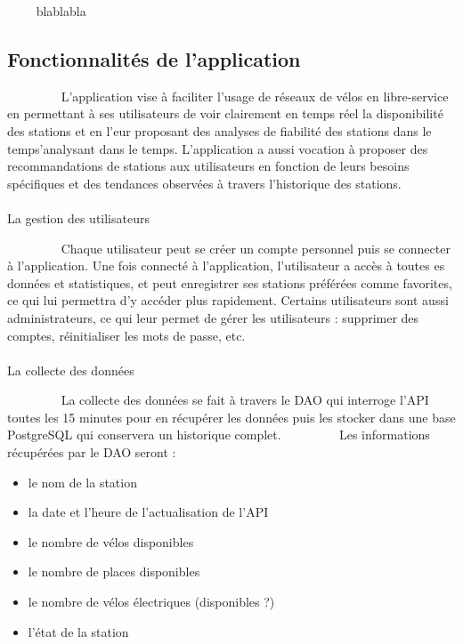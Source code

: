 \documentclass[
  french,
  11pt,
  a4paper,
]{article}
\makeatletter
\let\oldparagraph\paragraph
\renewcommand{\paragraph}{
    \@ifstar
      \xxxParagraphStar
      \xxxParagraphNoStar
  }
\newcommand{\xxxParagraphStar}[1]{\oldparagraph*{#1}\mbox{}}
\newcommand{\xxxParagraphNoStar}[1]{\oldparagraph{#1}\mbox{}}
\providecommand{\tightlist}{%
  \setlength{\itemsep}{0pt}\setlength{\parskip}{0pt}}
\makeatother
\begin{document}
~~~~ blablabla

\subsection{Fonctionnalités de
l'application}\label{fonctionnalituxe9s-de-lapplication}

~~~~~~~~ L'application vise à faciliter l'usage de réseaux de vélos en
libre-service en permettant à ses utilisateurs de voir clairement en
temps réel la disponibilité des stations et en l'eur proposant des
analyses de fiabilité des stations dans le temps'analysant dans le
temps. L'application a aussi vocation à proposer des recommandations de
stations aux utilisateurs en fonction de leurs besoins spécifiques et
des tendances observées à travers l'historique des stations.

\paragraph{La gestion des
utilisateurs}\label{la-gestion-des-utilisateurs}

~~~~~~~~ Chaque utilisateur peut se créer un compte personnel puis se
connecter à l'application. Une fois connecté à l'application,
l'utilisateur a accès à toutes es données et statistiques, et peut
enregistrer ses stations préférées comme favorites, ce qui lui permettra
d'y accéder plus rapidement. Certains utilisateurs sont aussi
administrateurs, ce qui leur permet de gérer les utilisateurs :
supprimer des comptes, réinitialiser les mots de passe, etc.

\paragraph{La collecte des données}\label{la-collecte-des-donnuxe9es}

~~~~~~~~ La collecte des données se fait à travers le DAO qui interroge
l'API toutes les 15 minutes pour en récupérer les données puis les
stocker dans une base PostgreSQL qui conservera un historique complet.
~~~~~~~~ Les informations récupérées par le DAO seront :

\begin{itemize}
\tightlist
\item
  le nom de la station
\item
  la date et l'heure de l'actualisation de l'API
\item
  le nombre de vélos disponibles
\item
  le nombre de places disponibles
\item
  le nombre de vélos électriques (disponibles ?)
\item
  l'état de la station
\end{itemize}
\end{document}
